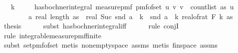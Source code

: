 \begin{isabellebody}
\ \ \ {\isachardoublequoteopen}k\ {\isasymge}\ {}{\isachardoublequoteclose}\isanewline
\ \ \ {\isachardoublequoteopen}has{\isacharunderscore}{\kern0pt}bochner{\isacharunderscore}{\kern0pt}integral\ {\isacharparenleft}{\kern0pt}measure{\isacharunderscore}{\kern0pt}pmf\ {\isacharparenleft}{\kern0pt}pmf{\isacharunderscore}{\kern0pt}of{\isacharunderscore}{\kern0pt}set\ {\isacharbraceleft}{\kern0pt}{\isacharparenleft}{\kern0pt}u{\isacharcomma}{\kern0pt}\ v{\isacharparenright}{\kern0pt}{\isachardot}{\kern0pt}\ v\ {\isacharless}{\kern0pt}\ count{\isacharunderscore}{\kern0pt}list\ as\ u{\isacharbraceright}{\kern0pt}{\isacharparenright}{\kern0pt}{\isacharparenright}{\kern0pt}\isanewline
\ \ \ \ \ \ \ \ {\isacharparenleft}{\kern0pt}{\isasymlambda}a{\isachardot}{\kern0pt}\ real\ {\isacharparenleft}{\kern0pt}length\ as{\isacharparenright}{\kern0pt}\ {\isacharasterisk}{\kern0pt}\ real\ {\isacharparenleft}{\kern0pt}Suc\ {\isacharparenleft}{\kern0pt}snd\ a{\isacharparenright}{\kern0pt}\ {\isacharcircum}{\kern0pt}\ k\ {\isacharminus}{\kern0pt}\ snd\ a\ {\isacharcircum}{\kern0pt}\ k{\isacharparenright}{\kern0pt}{\isacharparenright}{\kern0pt}\ {\isacharparenleft}{\kern0pt}real{\isacharunderscore}{\kern0pt}of{\isacharunderscore}{\kern0pt}rat\ {\isacharparenleft}{\kern0pt}F\ k\ as{\isacharparenright}{\kern0pt}{\isacharparenright}{\kern0pt}{\isachardoublequoteclose}\isanewline
%
\isadelimproof
%
\endisadelimproof
%
\isatagproof
{}\isamarkupfalse%
\ {\isacharminus}{\kern0pt}\isanewline
\ \ \isamarkupfalse%
\ {\isacharquery}{\kern0pt}thesis\isanewline
\ \ \ \ \isamarkupfalse%
\ {\isacharparenleft}{\kern0pt}subst\ has{\isacharunderscore}{\kern0pt}bochner{\isacharunderscore}{\kern0pt}integral{\isacharunderscore}{\kern0pt}iff{\isacharparenright}{\kern0pt}\isanewline
\ \ \ \ \isamarkupfalse%
\ {\isacharparenleft}{\kern0pt}rule\ conjI{\isacharparenright}{\kern0pt}\isanewline
\ \ \ \ \ \isamarkupfalse%
\ {\isacharparenleft}{\kern0pt}rule\ integrable{\isacharunderscore}{\kern0pt}measure{\isacharunderscore}{\kern0pt}pmf{\isacharunderscore}{\kern0pt}finite{\isacharparenright}{\kern0pt}\isanewline
\ \ \ \ \ \isamarkupfalse%
\ {\isacharparenleft}{\kern0pt}subst\ set{\isacharunderscore}{\kern0pt}pmf{\isacharunderscore}{\kern0pt}of{\isacharunderscore}{\kern0pt}set{\isacharcomma}{\kern0pt}\ metis\ non{\isacharunderscore}{\kern0pt}empty{\isacharunderscore}{\kern0pt}space\ assms{\isacharparenleft}{\kern0pt}{}{\isacharparenright}{\kern0pt}{\isacharcomma}{\kern0pt}\ metis\ fin{\isacharunderscore}{\kern0pt}space\ assms{\isacharparenleft}{\kern0pt}{}{\isacharparenright}{\kern0pt}{\isacharparenright}{\kern0pt}\isanewline

\end{isabellebody}
